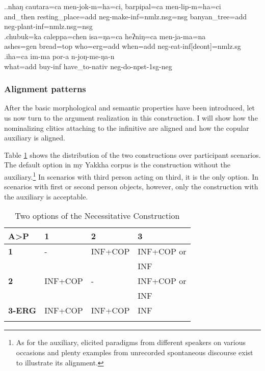 \ex.\ag.nhaŋ     cautara=ca  men-jok-m=ha=ci,  barpipal=ca  men-lip-m=ha=ci\\
and\_then resting\_place{\sc =add} {\sc neg-}make{\sc -inf=nmlz.nsg=nsg} banyan\_tree{\sc =add} {\sc neg-}plant{\sc -inf=nmlz.nsg=nsg} \\
\bg.chubuk=ka    caleppa=chen   isa=ŋa=ca          heʔniŋ=ca        men-ja-ma=na\\
ashes{\sc =gen} bread{\sc =top} who{\sc =erg=add} when{\sc =add} {\sc neg-}eat{\sc -inf[deont]=nmlz.sg}\\
 
\bg.iha=ca  im-ma     por-a           n-joŋ-me-ŋa-n\\
what{\sc =add} buy{\sc -inf} have\_to{\sc -nativ} {\sc neg-}do{\sc -npst-1sg-neg}\\
  



\subsubsection{Alignment patterns}

After the basic morphological and semantic properties have been introduced, let us now turn to the argument realization in this construction. I will show how the nominalizing clitics attaching to the infinitive are aligned and how the copular auxiliary is aligned. 

Table \ref{cop-options} shows the distribution of the two constructions over participant scenarios. The default option in my Yakkha corpus  is the construction without the auxiliary.\footnote{As for the auxiliary, elicited paradigms from different speakers on various occasions and plenty examples from unrecorded spontaneous discourse exist to illustrate its alignment.} In scenarios with third person acting on third, it is the only option. In scenarios with first or second person objects, however, only the construction with the auxiliary is acceptable.

\begin{table}
\centering
\begin{tabular}{llll}
\lsptoprule
{\bf A>P}&{\bf 1}&{\bf 2}&{\bf 3}\\
\midrule
 {\bf 1}	&-&INF+COP&INF+COP or\\
 &&&INF\\
 \midrule
 {\bf 2}&INF+COP&-&INF+COP or\\
 &&&INF\\
 \midrule
 {\bf 3-ERG}&INF+COP&INF+COP&INF\\
 \lspbottomrule
\end{tabular}
\caption{Two options of the Necessitative Construction}\label{cop-options}
\end{table}


